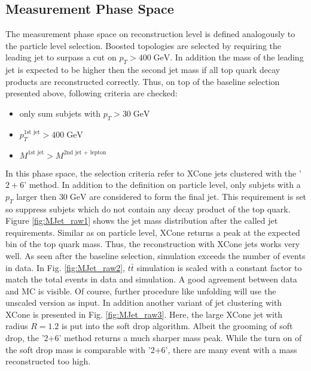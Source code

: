 \FloatBarrier %
\subsection{Measurement Phase Space}
\label{sec:FinalSel}
	The measurement phase space on reconstruction level is defined analogously to the particle level selection. Boosted topologies are selected by requiring the leading jet to surpass a cut on $p_T > 400\;\text{GeV}$. In addition the mass of the leading jet is expected to be higher then the second jet mass if all top quark decay products are reconstructed correctly. Thus, on top of the baseline selection presented above, following criteria are checked:
	\begin{itemize}
	\item only sum subjets with $p_T > 30\;\text{GeV}$ 
	\item $p_T^{\text{1st jet}} > 400\;\text{GeV}$ 
	\item $M^{\text{1st jet}} > M^{\text{2nd jet + lepton}}$
	\end{itemize}
	In this phase space, the selection criteria refer to XCone jets clustered with the '$2+6$' method.	In addition to the definition on particle level, only subjets with a $p_T$ larger then $30\;\text{GeV}$ are considered to form the final jet. This requirement is set so suppress subjets which do not contain any decay product of the top quark. Figure \ref{fig:MJet_raw1} shows the jet mass distribution after the called jet requirements. Similar as on particle level, XCone returns a peak at the expected bin of the top quark mass. Thus, the reconstruction with XCone jets works very well. As seen after the baseline selection, simulation exceeds the number of events in data. In Fig. \ref{fig:MJet_raw2}, $t\bar{t}$ simulation is scaled with a constant factor to match the total events in data and simulation. A good agreement between data and MC is visible. Of course, further procedure like unfolding will use the unscaled version as input. In addition another variant of jet clustering with XCone is presented in Fig. \ref{fig:MJet_raw3}. Here, the large XCone jet with radius $R=1.2$ is put into the soft drop algorithm. Albeit the grooming of soft drop, the '2+6' method returns a much sharper mass peak. While the turn on of the soft drop mass is comparable with '2+6', there are many event with a mass reconstructed too high.
